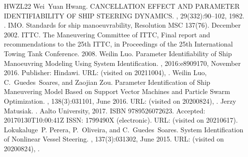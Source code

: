 \documentclass[review]{elsarticle}
\begin{document}
\begin{sphinxthebibliography}{HWZL22}
\sphinxAtStartPar
Wei Yuan Hwang. CANCELLATION EFFECT AND PARAMETER IDENTIFIABILITY OF SHIP STEERING DYNAMICS. , 29(332):90–102, 1982. .
\sphinxAtStartPar
IMO. Standards for ship manoeuvrability, Resolution MSC 137(76). December 2002.
\sphinxAtStartPar
ITTC. The Maneuvering Committee of ITTC, Final report and recommendations to the 25th ITTC, in Proceedings of the 25th International Towing Tank Conference. 2008.
\sphinxAtStartPar
Weilin Luo. Parameter Identifiability of Ship Manoeuvring Modeling Using System Identification. , 2016:e8909170, November 2016. Publisher: Hindawi. URL:  (visited on 2021\sphinxhyphen{}10\sphinxhyphen{}04), .
\sphinxAtStartPar
Weilin Luo, C. Guedes Soares, and Zaojian Zou. Parameter Identification of Ship Maneuvering Model Based on Support Vector Machines and Particle Swarm Optimization. , 138(3):031101, June 2016. URL:  (visited on 2020\sphinxhyphen{}08\sphinxhyphen{}24), .
\sphinxAtStartPar
Jerzy Matusiak. . Aalto University, 2017. ISBN 978\sphinxhyphen{}952\sphinxhyphen{}60\sphinxhyphen{}7262\sphinxhyphen{}3. Accepted: 2017\sphinxhyphen{}01\sphinxhyphen{}30T10:00:41Z ISSN: 1799\sphinxhyphen{}490X (electronic). URL:  (visited on 2021\sphinxhyphen{}06\sphinxhyphen{}17).
\sphinxAtStartPar
Lokukaluge P. Perera, P. Oliveira, and C. Guedes Soares. System Identification of Nonlinear Vessel Steering. , 137(3):031302, June 2015. URL:  (visited on 2020\sphinxhyphen{}08\sphinxhyphen{}24), .

\end{sphinxthebibliography}
\end{document}
